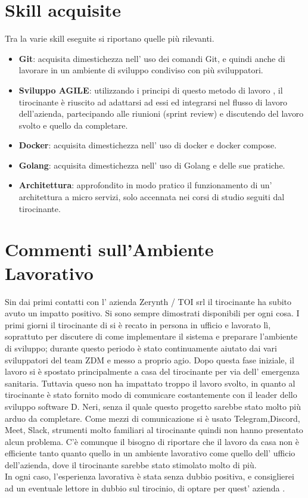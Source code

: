 \documentclass[a4paper,12pt,titlepage,italian,openany]{report}
\begin{document}
\section{Skill acquisite}
Tra la varie skill eseguite si riportano quelle più rilevanti.
\begin{itemize}
    \item[] \textbf{Git}: acquisita dimestichezza nell' uso dei comandi Git, e quindi anche di lavorare in un ambiente di sviluppo condiviso con più sviluppatori.
    \item[] \textbf{Sviluppo AGILE}: utilizzando i principi di questo metodo di lavoro , il tirocinante è riuscito ad adattarsi ad essi ed integrarsi nel flusso di lavoro dell'azienda, partecipando alle riunioni (sprint review) e discutendo del lavoro svolto e quello da completare.
    \item[] \textbf{Docker}: acquisita dimestichezza nell' uso di docker e docker compose.
    \item[] \textbf{Golang}: acquisita dimestichezza nell' uso di Golang e delle sue pratiche.
    \item[] \textbf{Architettura}: approfondito in modo pratico il funzionamento di un' architettura a micro servizi, solo accennata nei corsi di studio seguiti dal tirocinante.
    
\end{itemize}

\section{Commenti sull'Ambiente Lavorativo}
Sin dai primi contatti con l' azienda Zerynth / TOI srl il tirocinante ha subito avuto un impatto positivo. Si sono sempre dimostrati disponibili per ogni cosa.
I primi giorni il tirocinante di si è recato in persona in ufficio e lavorato lì, soprattuto per discutere di come implementare il sistema e preparare l'ambiente di sviluppo; durante questo periodo è stato continuamente aiutato dai vari sviluppatori del team ZDM\cite{zdm:1} e messo a proprio agio.
Dopo questa fase iniziale, il lavoro si è spostato principalmente a casa del tirocinante per via dell' emergenza sanitaria. Tuttavia queso non ha impattato troppo il lavoro svolto, in quanto al tirocinante è stato fornito modo di comunicare costantemente con il leader dello sviluppo software D. Neri, senza il quale questo progetto sarebbe stato molto più arduo da completare.
Come mezzi di comunicazione si è usato Telegram,Discord, Meet, Slack, strumenti molto familiari al tirocinante quindi non hanno presentato alcun problema. C'è comunque il bisogno di riportare che il lavoro da casa non è efficiente tanto quanto quello in un ambiente lavorativo come quello dell' ufficio dell'azienda, dove il tirocinante sarebbe stato stimolato molto di più. 
\\ In ogni caso, l'esperienza lavorativa è stata senza dubbio positiva, e consiglierei ad un eventuale lettore in dubbio sul tirocinio, di optare per quest' azienda .
\end{document}
